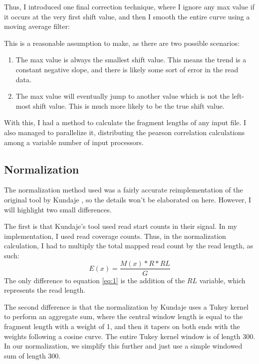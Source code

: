 \documentclass[a4paper]{article}
\begin{document}
    Thus, I introduced one final correction technique, where I ignore any max value if it occurs at the very first
    shift value, and then I smooth the entire curve using a moving average filter:
    
    This is a reasonable assumption to make, as there are two possible scenarios:
    \begin{enumerate}
      \item The max value is always the smallest shift value. This means the trend is a constant negative slope, and
            there is likely some sort of error in the read data.
      \item The max value will eventually jump to another value which is not the left-most shift value. This is much
            more likely to be the true shift value.
    \end{enumerate}
    With this, I had a method to calculate the fragment lengths of any input file. I also managed to parallelize it,
    distributing the pearson correlation calculations among a variable number of input processors.

    \subsection{Normalization}
    \label{methods:normalization}
    The normalization method used was a fairly accurate reimplementation of the original tool by Kundaje \cite{hoffman_integrative_2013}, so
    the details won't be elaborated on here. However, I will highlight two small differences.

    The first is that Kundaje's tool used read start counts in their signal. In my implementation, I used read
    coverage counts. Thus, in the normalization calculation, I had to multiply the total mapped read count by the read
    length, as such:
    \begin{equation}
      \label{eq:3}
      E(x) = \frac{M(x)*R*RL}{G}
    \end{equation}
    The only difference to equation \ref{eq:1} is the addition of the $RL$ variable, which represents the read length.

    The second difference is that the normalization by Kundaje uses a Tukey kernel to perform an aggregate sum,
    where the central window length is equal to the fragment length with a weight of 1, and then it tapers on both ends
    with the weights following a cosine curve. The entire Tukey kernel window is of length 300. In our normalization,
    we simplify this further and just use a simple windowed sum of length 300.
\end{document}
